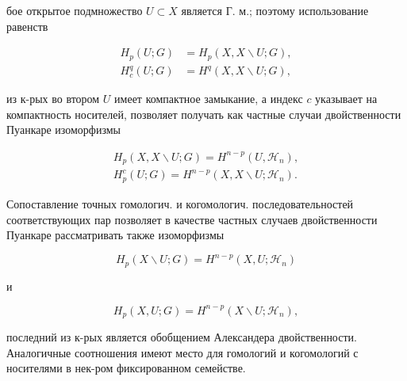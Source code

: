 \documentclass[10pt]{article}
\begin{document}
бое открытое подмножество $U \subset X$ является Г. м.; поэтому использование равенств



\[

\begin{aligned}

H_{p}(U ; G) & =H_{p}(X, X \backslash U ; G), \\

H_{c}^{q}(U ; G) & =H^{q}(X, X \backslash U ; G),

\end{aligned}

\]



из к-рых во втором $U$ имеет компактное замыкание, а индекс $c$ указывает на компактность носителей, позволяет получать как частные случаи двойственности Пуанкаре изоморфизмы



\[

\begin{gathered}

H_{p}(X, X \backslash U ; G)=H^{n-p}\left(U, \mathscr{H}_{n}\right), \\

H_{p}^{c}(U ; G)=H^{n-p}\left(X, X \backslash U ; \mathscr{H}_{n}\right) .

\end{gathered}

\]



Сопоставление точных гомологич. и когомологич. последовательностей соответствующих пар позволяет в качестве частных случаев двойственности Пуанкаре рассматривать также изоморфизмы



\[

H_{p}(X \backslash U ; G)=H^{n-p}\left(X, U ; \mathscr{H}_{n}\right)

\]



и



\[

H_{p}(X, U ; G)=H^{n-p}\left(X \backslash U ; \mathscr{H}_{n}\right),

\]



последний из к-рых является обобщением Александера двойственности. Аналогичные соотношения имеют место для гомологий и когомологий с носителями в нек-ром фиксированном семействе.
\end{document}
